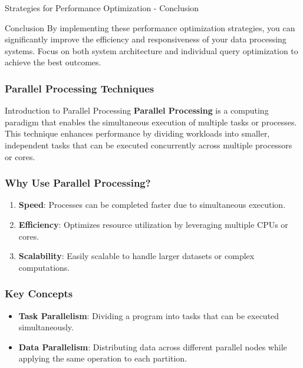 \documentclass[aspectratio=169]{beamer}
\begin{document}
\begin{frame}[fragile]{Strategies for Performance Optimization - Conclusion}
    \begin{block}{Conclusion}
        By implementing these performance optimization strategies, you can significantly improve the efficiency and responsiveness of your data processing systems. 
        Focus on both system architecture and individual query optimization to achieve the best outcomes.
    \end{block}
\end{frame}

\begin{frame}[fragile]
    \frametitle{Parallel Processing Techniques}
    
    \begin{block}{Introduction to Parallel Processing}
        \textbf{Parallel Processing} is a computing paradigm that enables the simultaneous execution of multiple tasks or processes. This technique enhances performance by dividing workloads into smaller, independent tasks that can be executed concurrently across multiple processors or cores.
    \end{block}
\end{frame}

\begin{frame}[fragile]
    \frametitle{Why Use Parallel Processing?}

    \begin{enumerate}
        \item \textbf{Speed}: Processes can be completed faster due to simultaneous execution.
        \item \textbf{Efficiency}: Optimizes resource utilization by leveraging multiple CPUs or cores.
        \item \textbf{Scalability}: Easily scalable to handle larger datasets or complex computations.
    \end{enumerate}
\end{frame}

\begin{frame}[fragile]
    \frametitle{Key Concepts}

    \begin{itemize}
        \item \textbf{Task Parallelism}: Dividing a program into tasks that can be executed simultaneously.
        \item \textbf{Data Parallelism}: Distributing data across different parallel nodes while applying the same operation to each partition.
    \end{itemize}
\end{frame}
\end{document}
